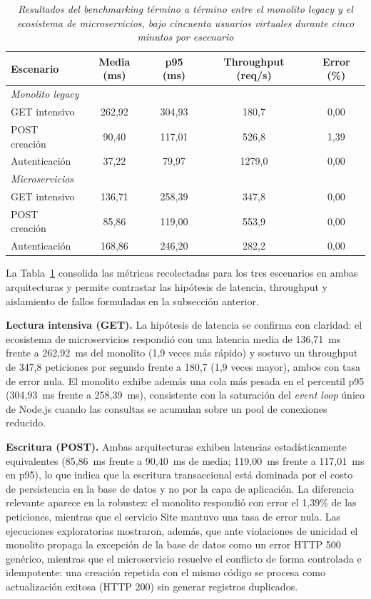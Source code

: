 \begin{table}[ht!]
\centering
{}
\begin{tabular}{lcccc}
\toprule
\textbf{Escenario} & \textbf{Media (ms)} & \textbf{p95 (ms)} & \textbf{Throughput (req/s)} & \textbf{Error (\%)} \\
\midrule
\multicolumn{5}{l}{\textit{Monolito legacy}} \\
GET intensivo & 262,92 & 304,93 & 180,7 & 0,00 \\
POST creación & 90,40 & 117,01 & 526,8 & 1,39 \\
Autenticación & 37,22 & 79,97 & 1279,0 & 0,00 \\
\multicolumn{5}{l}{\textit{Microservicios}} \\
GET intensivo & 136,71 & 258,39 & 347,8 & 0,00 \\
POST creación & 85,86 & 119,00 & 553,9 & 0,00 \\
Autenticación & 168,86 & 246,20 & 282,2 & 0,00 \\
\bottomrule
\end{tabular}
\caption{\textit{Resultados del benchmarking término a término entre el monolito legacy y el ecosistema de microservicios, bajo cincuenta usuarios virtuales durante cinco minutos por escenario}}
\label{tab:benchmark-resultados}
\end{table}

La Tabla~\ref{tab:benchmark-resultados} consolida las métricas recolectadas
para los tres escenarios en ambas arquitecturas y permite contrastar las
hipótesis de latencia, throughput y aislamiento de fallos formuladas en la
subsección anterior.

\textbf{Lectura intensiva (GET).} La hipótesis de latencia se confirma con
claridad: el ecosistema de microservicios respondió con una latencia media de
136,71~ms frente a 262,92~ms del monolito (1,9 veces más rápido) y sostuvo un
throughput de 347,8 peticiones por segundo frente a 180,7 (1,9 veces mayor),
ambos con tasa de error nula. El monolito exhibe además una cola más pesada en
el percentil p95 (304,93~ms frente a 258,39~ms), consistente con la saturación
del \textit{event loop} único de Node.js cuando las consultas se acumulan sobre
un pool de conexiones reducido.

\textbf{Escritura (POST).} Ambas arquitecturas exhiben latencias
estadísticamente equivalentes (85,86~ms frente a 90,40~ms de media; 119,00~ms
frente a 117,01~ms en p95), lo que indica que la escritura transaccional está
dominada por el costo de persistencia en la base de datos y no por la capa de
aplicación. La diferencia relevante aparece en la robustez: el monolito
respondió con error el 1,39\% de las peticiones, mientras que el servicio Site
mantuvo una tasa de error nula. Las ejecuciones exploratorias mostraron, además,
que ante violaciones de unicidad el monolito propaga la excepción de la base de
datos como un error HTTP 500 genérico, mientras que el microservicio resuelve el
conflicto de forma controlada e idempotente: una creación repetida con el mismo
código se procesa como actualización exitosa (HTTP 200) sin generar registros
duplicados.

